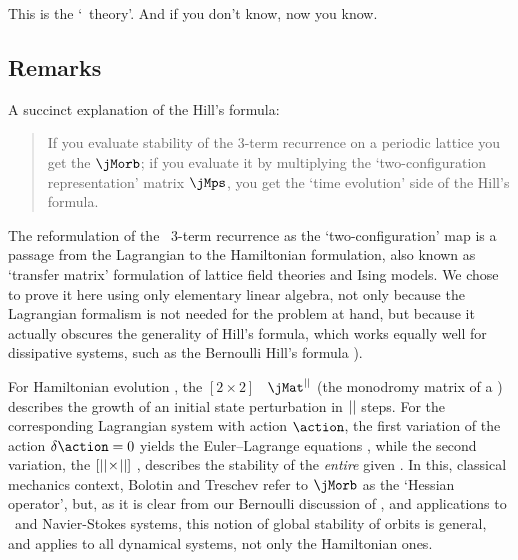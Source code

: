 This is the `\po\ theory'. And if you don't know,
 {now you know}.


\subsection{Remarks}
\label{s:LC21HillForm}

A succinct  explanation of the Hill's formula:
\begin{quote}
If you evaluate stability of the 3-term recurrence  on
a periodic lattice you get the {\jacobianOrb} $\jMorb$;
if you evaluate it by multiplying the `two-configuration representation'
matrix $\jMps$, you get the `time evolution' side of the Hill's formula.
\end{quote}

The reformulation of the \catlatt\ 3-term recurrence
as the `two-configuration' map
is a passage from the Lagrangian to the Hamiltonian formulation, also
known as `transfer matrix' formulation of lattice field
theories and Ising
models. We chose to prove it here using only
elementary linear algebra, not only because the Lagrangian
formalism is not needed for the problem at hand, but because
it actually obscures the generality of Hill's formula, which works
equally well for dissipative systems, such as the Bernoulli Hill's formula
).

For Hamiltonian evolution , the $[2\!\times\!2]$
\jacobianM\ $\jMat^\cl{}$ (the monodromy matrix of a \po) describes
the growth of an initial state perturbation in ${||}$ steps. For the
corresponding Lagrangian system with action $\action$,
the first variation of
the action $\delta\action=0$ yields the Euler–Lagrange equations
, while the second variation, the
$[{||}\!\times\!{||}]$ {\jacobianOrb} ,
describes the stability of the \emph{entire} given \po. In this,
classical mechanics context, Bolotin and Treschev refer to
$\jMorb$ as the `Hessian operator', but, as it is clear from our
Bernoulli discussion of , and applications to \KS\
and Navier-Stokes systems, this notion of global stability
of orbits is general, and applies to all dynamical systems, not only the
Hamiltonian ones.

